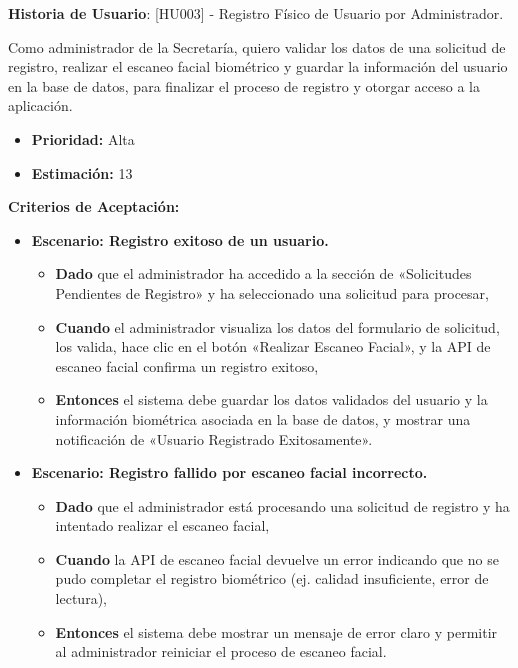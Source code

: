 \documentclass[12pt]{article}
\begin{document}
\pagebreak

\textbf{Historia de Usuario}: [HU003] - Registro Físico de Usuario por Administrador.

Como administrador de la Secretaría, quiero validar los datos de una solicitud de registro, realizar el escaneo facial biométrico y guardar la información del usuario en la base de datos, para finalizar el proceso de registro y otorgar acceso a la aplicación.

\begin{itemize}
    \item \textbf{Prioridad:} Alta
    \item \textbf{\textbf{Estimación:}} 13
\end{itemize}

\textbf{Criterios de Aceptación:}
\begin{itemize}
    \item \textbf{Escenario: Registro exitoso de un usuario.}
    \begin{itemize}
        \item \textbf{Dado} que el administrador ha accedido a la sección de «Solicitudes Pendientes de Registro» y ha seleccionado una solicitud para procesar,
        \item \textbf{Cuando} el administrador visualiza los datos del formulario de solicitud, los valida, hace clic en el botón «Realizar Escaneo Facial», y la API de escaneo facial confirma un registro exitoso,
        \item \textbf{Entonces} el sistema debe guardar los datos validados del usuario y la información biométrica asociada en la base de datos, y mostrar una notificación de «Usuario Registrado Exitosamente».
    \end{itemize}

    \item \textbf{Escenario: Registro fallido por escaneo facial incorrecto.}
    \begin{itemize}
        \item \textbf{Dado} que el administrador está procesando una solicitud de registro y ha intentado realizar el escaneo facial,
        \item \textbf{Cuando} la API de escaneo facial devuelve un error indicando que no se pudo completar el registro biométrico (ej. calidad insuficiente, error de lectura),
        \item \textbf{Entonces} el sistema debe mostrar un mensaje de error claro y permitir al administrador reiniciar el proceso de escaneo facial.
    \end{itemize}


\end{itemize}
\end{document}
